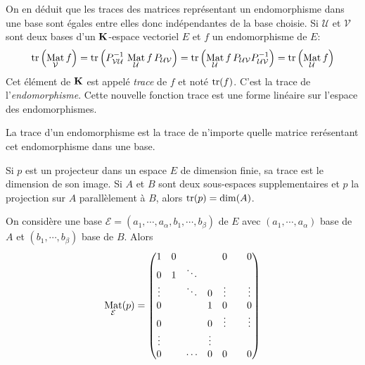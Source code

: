 \begin{rem}
  On en déduit que les traces des matrices représentant un endomorphisme dans une base sont égales entre elles donc indépendantes de la base choisie. Si $\mathcal U$ et $\mathcal V$ sont deux bases d'un $\mathbf{K}$-espace vectoriel $E$ et $f$ un endomorphisme de $E$:
\begin{displaymath}
 \mathop{\mathrm{tr}}\left( \mathop{\mathrm{Mat}}_{\mathcal V} f\right) 
=\mathop{\mathrm{tr}} \left(P_{\mathcal V \mathcal U}^{-1} \, \mathop{\mathrm{Mat}}_{\mathcal U}f \, P_{\mathcal U \mathcal V} \right) 
=\mathop{\mathrm{tr}} \left(\mathop{\mathrm{Mat}}_{\mathcal U}f \, P_{\mathcal U \mathcal V} P_{\mathcal U \mathcal V}^{-1}\right)
=\mathop{\mathrm{tr}} \left(\mathop{\mathrm{Mat}}_{\mathcal U}f\right) 
\end{displaymath}
Cet élément de $\mathbf{K}$ est appelé \emph{trace} de $f$ et noté $\mathop{\mathrm{tr}} (f)$. C'est la trace de l'\emph{endomorphisme}.
Cette nouvelle fonction trace est une forme linéaire sur l'espace des endomorphismes. 
\end{rem}
\begin{defi}
  La trace d'un endomorphisme est la trace de n'importe quelle matrice rerésentant cet endomorphisme dans une base.
\end{defi}

\begin{propn}
  Si $p$ est un projecteur dans un espace $E$ de dimension finie, sa trace est le dimension de son image. Si $A$ et $B$ sont deux sous-espaces supplementaires et $p$ la projection sur $A$ parallèlement à $B$, alors $\mathop{\mathrm{tr}}(p) = \dim(A)$.
\end{propn}
\begin{demo}
  On considère une base $\mathcal{E} = (a_1,\cdots,a_{\alpha},b_1,\cdots,b_{\beta})$ de $E$ avec $(a_1,\cdots,a_{\alpha})$ base de $A$ et $(b_1,\cdots,b_{\beta})$ base de $B$. Alors
\begin{displaymath}
  \mathop{\mathrm{Mat}}_{\mathcal{E}}(p)=
\begin{pmatrix}
1      & 0 &        &        & 0      &        & 0      \\
0      & 1 & \ddots &        &        &        &        \\
\vdots &   & \ddots & 0      & \vdots &        & \vdots \\
0      &   &        & 1      & 0      &        & 0      \\
0      &   &        & 0      & \vdots &        & \vdots \\
\vdots &   &        & \vdots &        &        &        \\
0      &   & \cdots & 0      & 0      &        & 0
\end{pmatrix}
\end{displaymath}
\end{demo}


